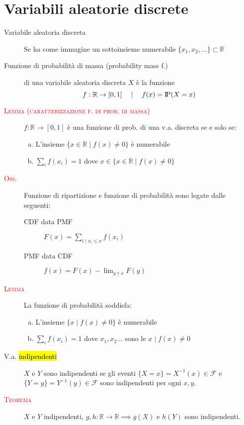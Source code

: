 \documentclass[a4paper,10pt]{article}
\newcommand{\myth}{\normalfont \scshape \textcolor{red}} %
\newcommand{\re}{\mathbb{R}} %
\newcommand{\pr}{\text{I\kern-0.15em P}} %
\theoremstyle{remark}
\theoremstyle{definition}
\begin{document}
\pagebreak
\part{Variabili aleatorie discrete}
\begin{description}

\item[Variabile aleatoria discreta] Se ha come immagine un sottoinsieme numerabile $\{x_1,x_2,\dots\}\subset\mathbb{R}$

\item[Funzione di probabilità di massa (probability mass f.)] di una variabile aleatoria discreta $X$ è la funzione \[f:\mathbb{R}\to[0,1] \quad \mid \quad  f(x)=\pr(X= x)\]
\item[\myth{Lemma (caratterizzazione f. di prob. di massa)}] $f: \re \to [0,1]$ è una funzione di prob. di una v.a. discreta se e solo se:
    \begin{enumerate}[(a)]
        \item L'insieme $\{x\in\re\mid f(x)\ne 0\}$ è numerabile
        \item $\sum_i f(x_i)=1$ dove $x\in \{x\in\re\mid f(x)\ne 0\}$
    \end{enumerate}

\item[\myth{Oss.}] Funzione di ripartizione e funzione di probabilità sono legate dalle seguenti:
\begin{description}
    \item[CDF data PMF] $F(x)=\sum_{i\mid x_i\le x}f(x_i)$
    \item[PMF data CDF] $f(x)=F(x)-\lim_{y\uparrow x}F(y)$
\end{description}
\item[\myth{Lemma}] La funzione di probabilità  soddisfa:
\begin{enumerate}[(a)]
    \item L'insieme $\{x\mid f(x) \ne 0\}$ è numerabile
    \item $\sum_{i}f(x_i)=1$ dove $x_1,x_2\dots$ sono le $x\mid f(x) \ne 0$
\end{enumerate}
\item[V.a. \hl{indipendenti}] $X$ e $Y$ sono indipendenti se gli eventi $\{X=x\}=X^{-1}(x)\in\mathcal{F}$ e $\{Y=y\}=Y^{-1}(y)\in\mathcal{F}$ sono indipendenti per ogni $x,y$.

\item[\myth{Teorema}] $X$ e $Y$ indipendenti, $g,h:\mathbb{R}\to\mathbb{R} \implies g(X)$ e $h(Y)$ sono indipendenti.


\end{description}
\end{document}
